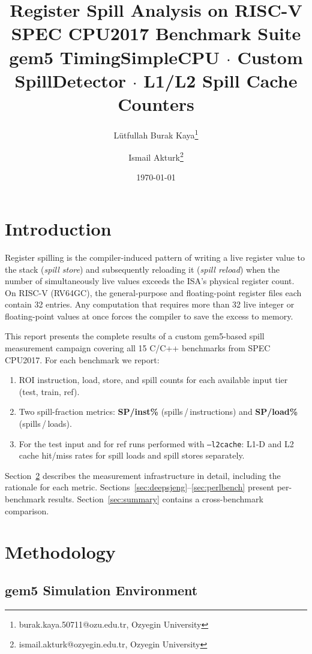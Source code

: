 \documentclass[11pt,a4paper]{article}
\title{
  \textbf{Register Spill Analysis on RISC-V}\\[4pt]
  \large SPEC CPU2017 Benchmark Suite\\
  \normalsize gem5 TimingSimpleCPU $\cdot$ Custom SpillDetector $\cdot$ L1/L2 Spill Cache Counters
}
\author{
  L\"utfullah Burak Kaya\thanks{burak.kaya.50711@ozu.edu.tr, Ozyegin University}
  \and
  Ismail Akturk\thanks{ismail.akturk@ozyegin.edu.tr, Ozyegin University}
}
\date{\today}
\begin{document}
\maketitle
\tableofcontents
\clearpage


\section{Introduction}
\label{sec:intro}

Register spilling is the compiler-induced pattern of writing a live
register value to the stack (\emph{spill store}) and subsequently
reloading it (\emph{spill reload}) when the number of simultaneously
live values exceeds the ISA's physical register count.  On RISC-V
(RV64GC), the general-purpose and floating-point register files each
contain 32 entries.  Any computation that requires more than 32
live integer or floating-point values at once forces the compiler to
save the excess to memory.

This report presents the complete results of a custom gem5-based
spill measurement campaign covering all 15 C/C++ benchmarks from
SPEC CPU2017.  For each benchmark we report:
\begin{enumerate}
  \item ROI instruction, load, store, and spill counts for each
        available input tier (test, train, ref).
  \item Two spill-fraction metrics: \textbf{SP/inst\%}
        (spills\,/\,instructions) and \textbf{SP/load\%}
        (spills\,/\,loads).
  \item For the test input and for ref runs performed with
        \texttt{--l2cache}: L1-D and L2 cache hit/miss rates
        for spill loads and spill stores separately.
\end{enumerate}

Section~\ref{sec:method} describes the measurement infrastructure in
detail, including the rationale for each metric.
Sections~\ref{sec:deepsjeng}--\ref{sec:perlbench} present
per-benchmark results.
Section~\ref{sec:summary} contains a cross-benchmark comparison.


\section{Methodology}
\label{sec:method}

\subsection{gem5 Simulation Environment}
\end{document}

